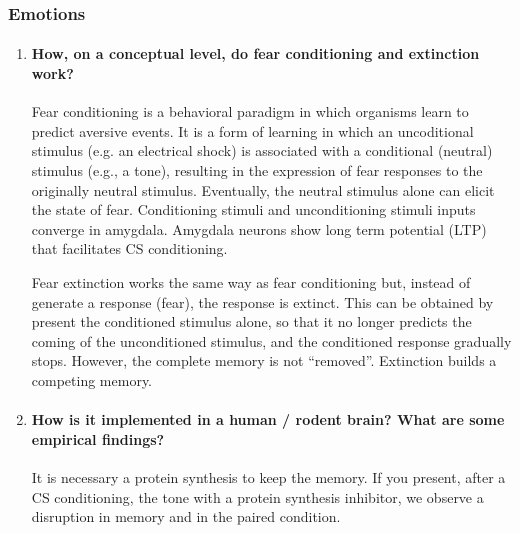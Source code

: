 \documentclass[12pt,article,oneside,a4paper]{memoir}
\begin{document}
\subsubsection{Emotions}
\begin{enumerate}
\item \paragraph{How, on a conceptual level, do fear conditioning and
extinction work?}
Fear conditioning is a behavioral paradigm in which organisms learn to predict
aversive events. It is a form of learning in which an uncoditional stimulus
(e.g. an electrical shock) is associated with a conditional (neutral) stimulus
(e.g., a tone), resulting in the expression of fear responses to the originally
neutral stimulus. Eventually, the neutral stimulus alone can elicit the state
of fear. Conditioning stimuli and unconditioning stimuli inputs converge in
amygdala. Amygdala neurons show long term potential (LTP) that facilitates CS
conditioning.

Fear extinction works the same way as fear conditioning but, instead of
generate a response (fear), the response is extinct. This can be obtained by
present the conditioned stimulus alone, so that it no longer predicts the
coming of the unconditioned stimulus, and the conditioned response gradually
stops. However, the complete memory is not ``removed''. Extinction builds a
competing memory.

\item \paragraph{How is it implemented in a human / rodent brain? What are some
empirical findings?}

It is necessary a protein synthesis to keep the memory. If you present, after a
CS conditioning, the tone with a protein synthesis inhibitor, we observe a
disruption in memory and in the paired condition.

\end{enumerate}

\end{document}
